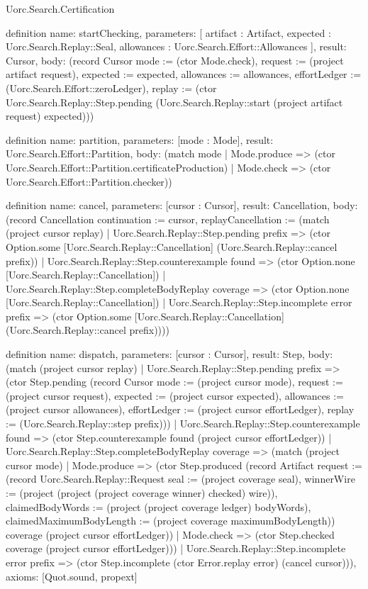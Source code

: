 \begin{lexlean}{Uorc.Search.Certification}
\begin{semanticmodule}
definition{
  name: startChecking,
  parameters: [
    artifact : Artifact,
    expected : Uorc.Search.Replay::Seal,
    allowances : Uorc.Search.Effort::Allowances
  ],
  result: Cursor,
  body: (record Cursor {mode := (ctor Mode.check), request := (project artifact request), expected := expected, allowances := allowances, effortLedger := (Uorc.Search.Effort::zeroLedger), replay := (ctor Uorc.Search.Replay::Step.pending (Uorc.Search.Replay::start (project artifact request) expected))})
}

definition{
  name: partition,
  parameters: [mode : Mode],
  result: Uorc.Search.Effort::Partition,
  body: (match mode
    | Mode.produce => (ctor Uorc.Search.Effort::Partition.certificateProduction)
    | Mode.check => (ctor Uorc.Search.Effort::Partition.checker))
}

definition{
  name: cancel,
  parameters: [cursor : Cursor],
  result: Cancellation,
  body: (record Cancellation {continuation := cursor, replayCancellation := (match (project cursor replay)
    | Uorc.Search.Replay::Step.pending prefix => (ctor Option.some [Uorc.Search.Replay::Cancellation] (Uorc.Search.Replay::cancel prefix))
    | Uorc.Search.Replay::Step.counterexample found => (ctor Option.none [Uorc.Search.Replay::Cancellation])
    | Uorc.Search.Replay::Step.completeBodyReplay coverage => (ctor Option.none [Uorc.Search.Replay::Cancellation])
    | Uorc.Search.Replay::Step.incomplete error prefix => (ctor Option.some [Uorc.Search.Replay::Cancellation] (Uorc.Search.Replay::cancel prefix)))})
}

definition{
  name: dispatch,
  parameters: [cursor : Cursor],
  result: Step,
  body: (match (project cursor replay)
    | Uorc.Search.Replay::Step.pending prefix => (ctor Step.pending (record Cursor {mode := (project cursor mode), request := (project cursor request), expected := (project cursor expected), allowances := (project cursor allowances), effortLedger := (project cursor effortLedger), replay := (Uorc.Search.Replay::step prefix)}))
    | Uorc.Search.Replay::Step.counterexample found => (ctor Step.counterexample found (project cursor effortLedger))
    | Uorc.Search.Replay::Step.completeBodyReplay coverage => (match (project cursor mode)
      | Mode.produce => (ctor Step.produced (record Artifact {request := (record Uorc.Search.Replay::Request {seal := (project coverage seal), winnerWire := (project (project (project coverage winner) checked) wire)}), claimedBodyWords := (project (project coverage ledger) bodyWords), claimedMaximumBodyLength := (project coverage maximumBodyLength)}) coverage (project cursor effortLedger))
      | Mode.check => (ctor Step.checked coverage (project cursor effortLedger)))
    | Uorc.Search.Replay::Step.incomplete error prefix => (ctor Step.incomplete (ctor Error.replay error) (cancel cursor))),
  axioms: [Quot.sound, propext]
}


\end{semanticmodule}
\end{lexlean}
